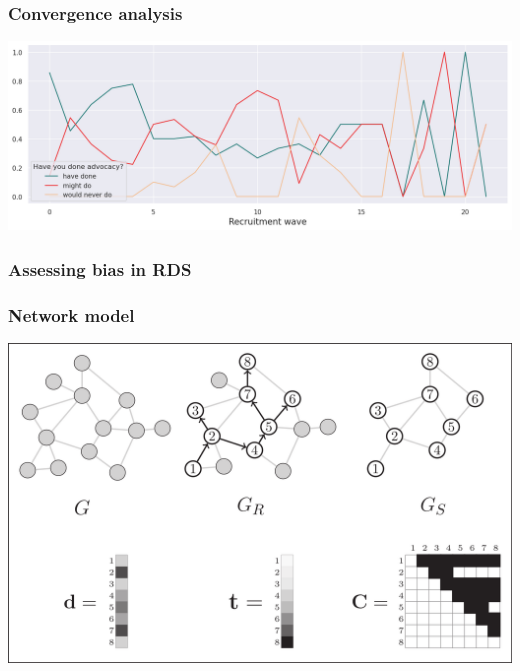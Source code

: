 \documentclass{beamer}
\begin{document}
\begin{frame}
  \frametitle{Convergence analysis}

  \includegraphics[width=\textwidth]{../../images/recruitment-wave-convergence.png}
\end{frame}

\begin{frame}
  \frametitle{Assessing bias in RDS}
\end{frame}

\begin{frame}
  \frametitle{Network model}

  \includegraphics[width=\textwidth]{../../images/graphical-model-example.png}
  
\end{frame}
\end{document}
